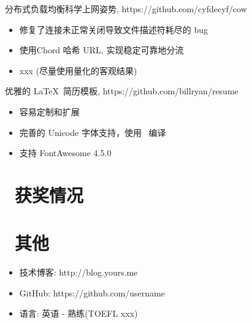 \documentclass{resume}
\begin{document}
\begin{onehalfspacing}
分布式负载均衡科学上网姿势, https://github.com/cyfdecyf/cow
\begin{itemize}
  \item 修复了连接未正常关闭导致文件描述符耗尽的 bug
  \item 使用Chord 哈希 URL, 实现稳定可靠地分流
  \item xxx (尽量使用量化的客观结果)
\end{itemize}
\end{onehalfspacing}

\begin{onehalfspacing}
优雅的 \LaTeX\ 简历模板, https://github.com/billryan/resume
\begin{itemize}
  \item 容易定制和扩展
  \item 完善的 Unicode 字体支持，使用 \XeLaTeX\ 编译
  \item 支持 FontAwesome 4.5.0
\end{itemize}
\end{onehalfspacing}


\section{\faHeartO\ 获奖情况}

\section{\faInfo\ 其他}
\begin{itemize}[parsep=0.5ex]
  \item 技术博客: http://blog.yours.me
  \item GitHub: https://github.com/username
  \item 语言: 英语 - 熟练(TOEFL xxx)
\end{itemize}

%
%
\end{document}

